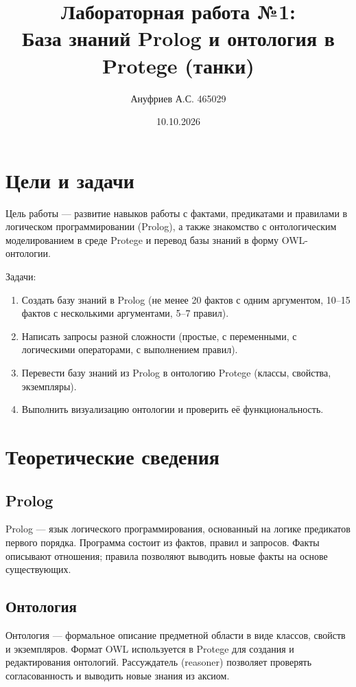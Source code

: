 \documentclass[12pt,a4paper]{article}
\title{Лабораторная работа №1:\\База знаний Prolog и онтология в Protege (танки)}
\author{Ануфриев А.С. 465029}
\date{10.10.2026}
\begin{document}
\maketitle

\section{Цели и задачи}

Цель работы --- развитие навыков работы с фактами, предикатами и правилами в логическом программировании (Prolog), а также знакомство с онтологическим моделированием в среде Protege и перевод базы знаний в форму OWL-онтологии.

Задачи:
\begin{enumerate}
    \item Создать базу знаний в Prolog (не менее 20 фактов с одним аргументом, 10--15 фактов с несколькими аргументами, 5--7 правил).
    \item Написать запросы разной сложности (простые, с переменными, с логическими операторами, с выполнением правил).
    \item Перевести базу знаний из Prolog в онтологию Protege (классы, свойства, экземпляры).
    \item Выполнить визуализацию онтологии и проверить её функциональность.
\end{enumerate}

\section{Теоретические сведения}

\subsection{Prolog}
Prolog --- язык логического программирования, основанный на логике предикатов первого порядка. Программа состоит из фактов, правил и запросов. Факты описывают отношения; правила позволяют выводить новые факты на основе существующих.

\subsection{Онтология}
Онтология --- формальное описание предметной области в виде классов, свойств и экземпляров. Формат OWL используется в Protege для создания и редактирования онтологий. Рассуждатель (reasoner) позволяет проверять согласованность и выводить новые знания из аксиом.
\end{document}
